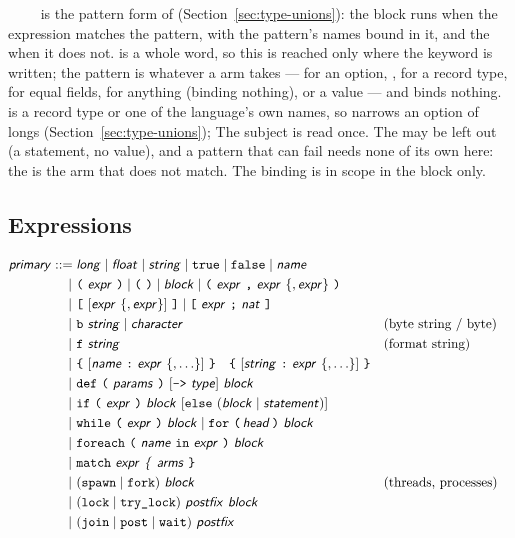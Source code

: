 \noindent {}~~\ic{=}~~ is the
pattern form of  (Section~\ref{sec:type-unions}): the block runs when
the expression matches the pattern, with the pattern's names bound in it, and
the  when it does not.  is a whole word, so this is
reached only where the keyword is written; the pattern is whatever a
 arm takes ---  for an option, ,
 for a record type,  for equal fields,
\ic{\_} for anything (binding nothing), or a value --- and  binds
nothing.  is a record type or one of the language's own names, so
 narrows an option of longs
(Section~\ref{sec:type-unions}); The subject is read once. The
 may be left out (a statement, no value), and a pattern that can
fail needs none of its own here: the  is the arm that does not
match. The binding is in scope in the block only.

\subsection{Expressions}
\label{sec:expr-grammar}

\begin{align*}
\ty{primary} ::={}& \ty{long} \mid \ty{float} \mid \ty{string}
     \mid \ic{true} \mid \ic{false} \mid \ty{name} \\
  |~& \ic{(}~\ty{expr}~\ic{)} \mid \ic{(}~\ic{)} \mid \ty{block}
       \mid \ic{(}~\ty{expr}~\ic{,}~\ty{expr}~\{,\ty{expr}\}~\ic{)} \\
  |~& \ic{[}~[\ty{expr}~\{,\ty{expr}\}]~\ic{]}
       \mid \ic{[}~\ty{expr}~\ic{;}~\ty{nat}~\ic{]} \\
  |~& \ic{b}~\ty{string} \mid \ty{character}                && \text{(byte string / byte)} \\
  |~& \ic{f}~\ty{string}                && \text{(format string)} \\
  |~& \ic{\{}~[\ty{name}~\ic{:}~\ty{expr}~\{,\ldots\}]~\ic{\}}
       \quad \ic{\{}~[\ty{string}~\ic{:}~\ty{expr}~\{,\ldots\}]~\ic{\}} \\
  |~& \ic{def}~\ic{(}~\ty{params}~\ic{)}~[\ic{->}~\ty{type}]~\ty{block} \\
  |~& \ic{if}~\ic{(}~\ty{expr}~\ic{)}~\ty{block}
       ~[\ic{else}~(\ty{block} \mid \ty{statement})] \\
  |~& \ic{while}~\ic{(}~\ty{expr}~\ic{)}~\ty{block}
       \mid \ic{for}~\ic{(}\,\ty{head}\,\ic{)}~\ty{block} \\
  |~& \ic{foreach}~\ic{(}~\ty{name}~\ic{in}~\ty{expr}~\ic{)}~\ty{block} \\
  |~& \ic{match}~\ty{expr}~\ty{\{}~\ty{arms}~\ic{\}} \\
  |~& (\ic{spawn} \mid \ic{fork})~\ty{block}
       && \text{(threads, processes)} \\
  |~& (\ic{lock} \mid \ic{try\_lock})~\ty{postfix}~\ty{block} \\
  |~& (\ic{join} \mid \ic{post} \mid \ic{wait})~\ty{postfix}
\end{align*}

